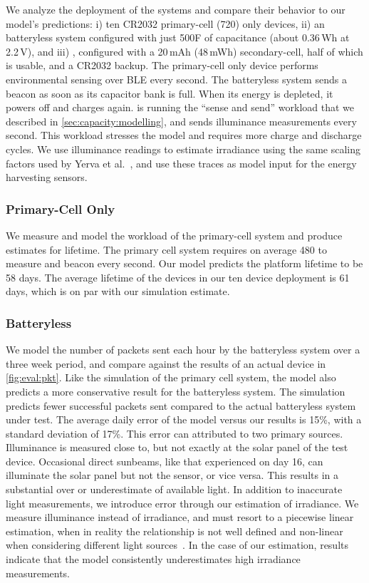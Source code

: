 We analyze the deployment of the systems 
and compare their behavior to our
model's predictions: i) ten CR2032 primary-cell (720\ssi{\milli\Wh}) only devices, ii) an
batteryless system configured with just 500\textmu F of capacitance (about
0.36\,\textmu Wh at 2.2\,V), and iii) \name, configured with a 20\,mAh
(48\,mWh) secondary-cell, half of which is usable, and a CR2032 backup.  The
primary-cell only device performs environmental sensing over BLE every second.
The batteryless system  sends a beacon as soon as its capacitor bank is full.
When its energy is depleted, it powers off and charges
again. \name is running the ``sense and send'' workload that we described in
\cref{sec:capacity:modelling}, and sends illuminance measurements every second. This
workload stresses the model and requires more charge and discharge cycles.  We
use \name illuminance readings to estimate irradiance using the same scaling factors used by
Yerva et al.~\cite{yervaGrafting12}, and use these traces as
model input for the energy harvesting sensors.

\subsubsection{Primary-Cell Only}
We measure and model the workload of the primary-cell system and produce estimates for
lifetime. The primary cell system requires on average 480\ssi{\micro\watt} to measure and beacon every second. Our model predicts the platform lifetime
to be 58 days.  The average lifetime of the devices in our ten device deployment is 61 days, which is on par with our simulation estimate. 

\subsubsection{Batteryless}
We model the number of packets sent each hour by the
batteryless system over a three week period, and compare against the results of an actual device in
\cref{fig:eval:pkt}.
Like the simulation of the primary cell system, the model also predicts a more conservative result for the batteryless system. 
The simulation predicts fewer successful packets sent compared to the actual batteryless system under test. 
The average daily error of the model versus our results is 15\%, with a standard deviation of
17\%. This error can attributed to two primary sources. Illuminance is measured
close to, but not exactly at the solar panel of the test device. Occasional
direct sunbeams, like that experienced on day 16, can illuminate the solar
panel but not the sensor, or vice versa. This
results in a substantial over or underestimate of available light. In addition
to inaccurate light measurements, we introduce error through our estimation of
irradiance. We measure illuminance
instead of irradiance, and must resort to a piecewise linear estimation, when
in reality the relationship is not well defined and non-linear when considering
different light sources~\cite{michael2020conversion}. In the case of our estimation, results
indicate that the model consistently underestimates high irradiance measurements.

